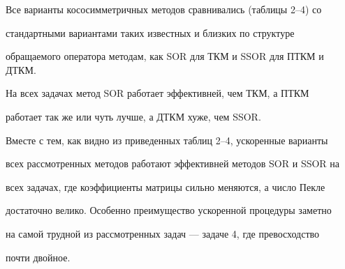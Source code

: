 Все варианты кососимметричных методов сравнивались (таблицы 2--4) со 


стандартными вариантами таких известных и близких по структуре 


обращаемого оператора методам, как SOR для ТКМ и SSOR для ПТКМ и ДТКМ. 


 


На всех задачах метод SOR работает эффективней, чем ТКМ, а ПТКМ 


работает так же или чуть лучше, а ДТКМ хуже, чем SSOR. 


 


Вместе с тем, как видно из приведенных таблиц 2--4, ускоренные варианты 


всех рассмотренных методов работают эффективней методов SOR и SSOR на 


всех задачах, где коэффициенты матрицы сильно меняются, а число Пекле 


достаточно велико. Особенно преимущество ускоренной процедуры заметно 


на самой трудной из рассмотренных задач --- задаче 4, где превосходство 


почти двойное. 


\medskip 


 


